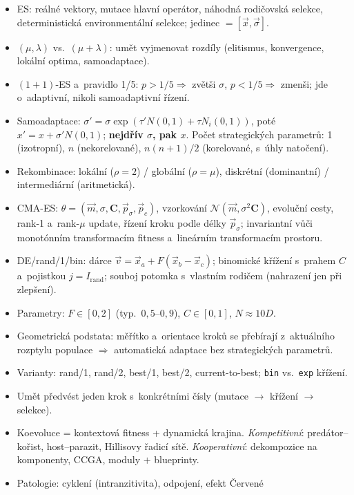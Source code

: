 \documentclass[11pt,a4paper]{article}
\theoremstyle{definition}
\begin{document}
\begin{itemize}
\item ES: reálné vektory, mutace hlavní operátor, náhodná rodičovská selekce,
  deterministická environmentální selekce; jedinec $= [\vec x, \vec\sigma]$.
\item $(\mu,\lambda)$ vs.\ $(\mu+\lambda)$: umět vyjmenovat rozdíly
  (elitismus, konvergence, lokální optima, samoadaptace).
\item $(1+1)$-ES a~pravidlo 1/5: $p > 1/5 \Rightarrow$ zvětši $\sigma$,
  $p < 1/5 \Rightarrow$ zmenši; jde o~adaptivní, nikoli samoadaptivní řízení.
\item Samoadaptace: $\sigma' = \sigma \exp(\tau'N(0,1) + \tau N_i(0,1))$,
  poté $x' = x + \sigma' N(0,1)$; \textbf{nejdřív $\sigma$, pak $x$}.
  Počet strategických parametrů: 1 (izotropní), $n$ (nekorelované),
  $n(n+1)/2$ (korelované, s~úhly natočení).
\item Rekombinace: lokální ($\rho=2$) / globální ($\rho=\mu$),
  diskrétní (dominantní) / intermediární (aritmetická).
\item CMA-ES: $\theta = (\vec m,\sigma,\mathbf C,\vec p_\sigma,\vec p_c)$,
  vzorkování $\mathcal N(\vec m, \sigma^2\mathbf C)$, evoluční cesty,
  rank-1 a~rank-$\mu$ update, řízení kroku podle délky $\vec p_\sigma$;
  invariantní vůči monotónním transformacím fitness a~lineárním transformacím
  prostoru.
\item DE/rand/1/bin: dárce $\vec v = \vec x_a + F(\vec x_b - \vec x_c)$;
  binomické křížení s~prahem $C$ a~pojistkou $j = I_{\mathrm{rand}}$;
  souboj potomka s~vlastním rodičem (nahrazení jen při zlepšení).
\item Parametry: $F \in [0,2]$ (typ.\ $0{,}5$--$0{,}9$), $C \in [0,1]$,
  $N \approx 10D$.
\item Geometrická podstata: měřítko a~orientace kroků se přebírají z~aktuálního
  rozptylu populace $\Rightarrow$ automatická adaptace bez strategických
  parametrů.
\item Varianty: rand/1, rand/2, best/1, best/2, current-to-best;
  \texttt{bin} vs.\ \texttt{exp} křížení.
\item Umět předvést jeden krok s~konkrétními čísly (mutace $\to$ křížení
  $\to$ selekce).
\item Koevoluce = kontextová fitness + dynamická krajina.
  \emph{Kompetitivní}: predátor--kořist, host--parazit, Hillisovy řadicí
  sítě. \emph{Kooperativní}: dekompozice na komponenty, CCGA,
  moduly $+$ blueprinty.
\item Patologie: cyklení (in\-tran\-zi\-ti\-vi\-ta), odpojení, efekt Červené

\end{itemize}
\end{document}
